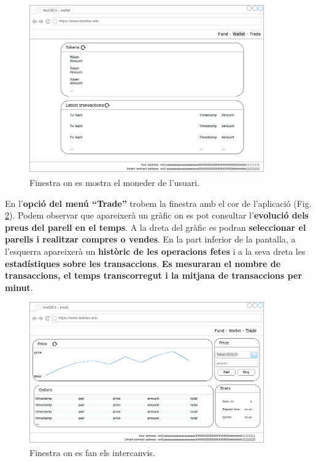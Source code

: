 \documentclass[11pt,a4paper]{article}
\begin{document}
\begin{figure}[h]
\includegraphics[width=0.9\textwidth]{screen_wallet.png}
\centering
\caption{Finestra on es mostra el moneder de l'usuari.}\label{fig:screen_wallet}
\end{figure} 

En l'\textbf{opció del menú ``Trade''} trobem la finestra amb el cor de l'aplicació (Fig. \ref{fig:screen_trade}). Podem observar que apareixerà un gràfic on es pot consultar l'\textbf{evolució dels preus del parell en el temps}. A la dreta del gràfic es podran \textbf{seleccionar el parells i realitzar compres o vendes}. En la part inferior de la pantalla, a l'esquerra apareixerà un \textbf{històric de les operacions fetes} i a la seva dreta les \textbf{estadístiques sobre les transaccions}. \textbf{Es mesuraran el nombre de transaccions, el temps transcorregut i la mitjana de transaccions per minut}.

\begin{figure}[h]
\includegraphics[width=0.9\textwidth]{screen_trade.png}
\centering
\caption{Finestra on es fan els intercanvis.}\label{fig:screen_trade}
\end{figure} 
\end{document}
